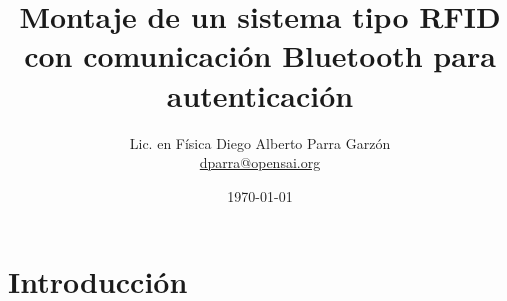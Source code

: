 \documentclass[jou]{apa6} %
\title{Montaje de un sistema  tipo RFID con comunicación Bluetooth para autenticación}
\author{Lic. en Física Diego Alberto Parra Garzón \\ \href{mailto:{dparra@opensai.org}}{dparra@opensai.org}}
\date{\today}
\affiliation{OPENSAI, SENA}
\begin{document}
\renewcommand{\tablename}{Tabla} %
\renewcommand{\refname}{Referencias} %
\def\st@rtbibsection{\mspart{Referencias}}%
\renewcommand{\rheadname}{Encabezado de página}%
\renewcommand{\acksname}{Nota de Autor}%
\renewcommand{\keywordname}{Palabras clave}%
\renewcommand{\listtablename}{Índice de tablas}%
\renewcommand{\BOthers}[1]{et al.\hbox{}}
\renewcommand{\appendixname}{Ap} %
\renewcommand{\appendixname}{Anexo}
\renewcommand{\appendixname}{Anexos}
\renewcommand{\appendixtocname}{Anexos}
\renewcommand{\appendixpagename}{Anexos}
\maketitle



\tableofcontents
\listoffigures

\section{Introducción}




\end{document}
